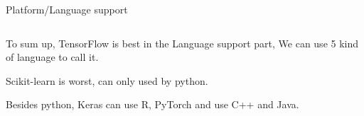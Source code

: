 \documentclass[10pt]{beamer}
\begin{document}
\begin{frame}{Platform/Language support}
\begin{columns}[b, onlytextwidth]
    \begin{table}[h!]
    \begin{center}
    \caption{platform support}
    \label{tab:ps3.5.2}
    \end{center}
    \end{table}
    
    
    \begin{table}[h!]
    \begin{center}
    \caption{language support}
    \end{center}
    \end{table}
\end{columns}
    To sum up, TensorFlow is best in the Language support part, We can use 5 kind of language to call it.\par Scikit-learn is worst, can only used by python. \par
    Besides python, Keras can use R, PyTorch and use C++ and Java.\par
\end{frame}
\end{document}
